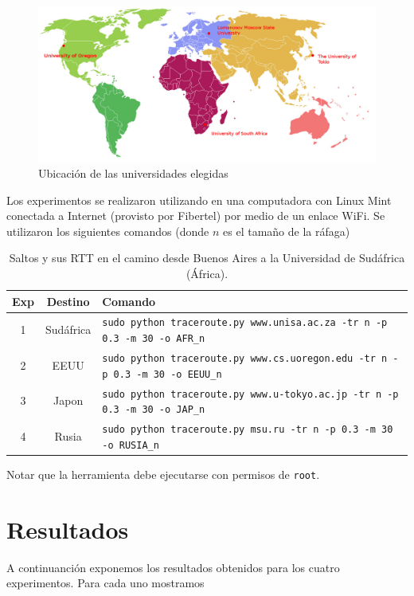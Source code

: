  
\begin{figure}[H]
  \centering
  \includegraphics[scale = 0.3]{imagenes/mapa.png}
  \caption{Ubicación de las universidades elegidas}
  \label{histogramaprobabilidadesModel1}
\end{figure}


Los experimentos se realizaron utilizando en una computadora con Linux Mint conectada a Internet (provisto por Fibertel) por medio de un enlace WiFi. Se utilizaron los siguientes comandos (donde $n$ es el tamaño de la ráfaga) 
\begin{table}[]
\centering
\caption{Saltos y sus RTT en el camino desde Buenos Aires a la Universidad de Sudáfrica (África).}
\begin{tabular}{ | c | c | l |}
	\hline 
Exp & Destino & Comando\\ \hline
 1 & Sudáfrica & \texttt{sudo python traceroute.py www.unisa.ac.za -tr n -p 0.3 -m 30 -o AFR\_n} \\ 
  2 & EEUU& \texttt{sudo python traceroute.py www.cs.uoregon.edu -tr n -p 0.3 -m 30 -o EEUU\_n} \\ 
  3 & Japon& \texttt{sudo python traceroute.py www.u-tokyo.ac.jp -tr n -p 0.3 -m 30 -o JAP\_n} \\ 
  4 & Rusia & \texttt{sudo python traceroute.py msu.ru -tr n -p 0.3 -m 30 -o RUSIA\_n} \\ 
  \hline

\end{tabular}
\end{table}
  Notar que la herramienta debe ejecutarse con permisos de \texttt{root}.
  
\section{Resultados}

A continuanción exponemos los resultados obtenidos para los cuatro experimentos. 
Para cada uno mostramos 

